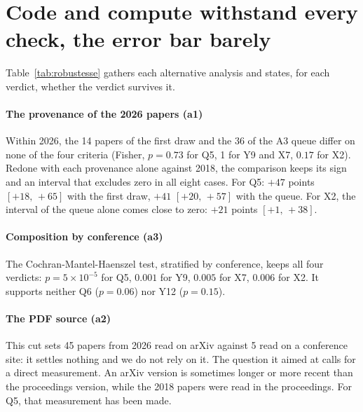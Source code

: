 \section{Code and compute withstand every check, the error bar barely}\label{sec:sr-robustesse}

Table~\ref{tab:robustesse} gathers each alternative analysis and states, for each verdict, whether the
verdict survives it.


\paragraph{The provenance of the 2026 papers (a1)}
Within 2026, the 14 papers of the first draw and the 36 of the A3 queue differ on none of the four
criteria (Fisher, $p = 0.73$ for Q5, 1 for Y9 and X7, $0.17$ for X2). Redone with each provenance
alone against 2018, the comparison keeps its sign and an interval that excludes zero in all eight
cases. For Q5: $+47$ points $[+18,\,+65]$ with the first draw, $+41$ $[+20,\,+57]$ with the queue. For
X2, the interval of the queue alone comes close to zero: $+21$ points $[+1,\,+38]$.

\paragraph{Composition by conference (a3)}
The Cochran-Mantel-Haenszel test, stratified by conference, keeps all four verdicts:
$p = 5 \times 10^{-5}$ for Q5, $0.001$ for Y9, $0.005$ for X7, $0.006$ for X2. It supports neither Q6
($p = 0.06$) nor Y12 ($p = 0.15$).

\paragraph{The PDF source (a2)}
This cut sets 45 papers from 2026 read on arXiv against 5 read on a conference site: it settles
nothing and we do not rely on it. The question it aimed at calls for a direct measurement. An arXiv
version is sometimes longer or more recent than the proceedings version, while the 2018 papers were read in
the proceedings. For Q5, that measurement has been made.

